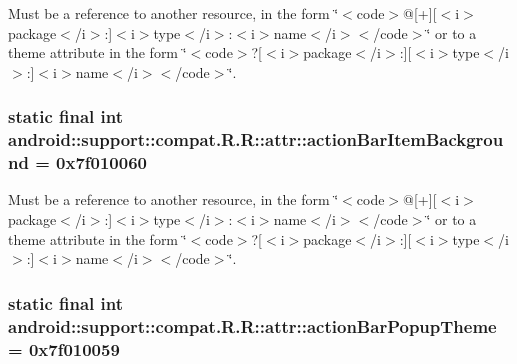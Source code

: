 Must be a reference to another resource, in the form \char`\"{}$<$code$>$@\mbox{[}+\mbox{]}\mbox{[}$<$i$>$package$<$/i$>$:\mbox{]}$<$i$>$type$<$/i$>$:$<$i$>$name$<$/i$>$$<$/code$>$\char`\"{} or to a theme attribute in the form \char`\"{}$<$code$>$?\mbox{[}$<$i$>$package$<$/i$>$:\mbox{]}\mbox{[}$<$i$>$type$<$/i$>$:\mbox{]}$<$i$>$name$<$/i$>$$<$/code$>$\char`\"{}. \hypertarget{classandroid_1_1support_1_1compat_1_1_r_1_1attr_c2de6e88cf678af3f457b2fa0781e0b9}{
\subsubsection[{actionBarItemBackground}]{\setlength{\rightskip}{0pt plus 5cm}static final int android::support::compat.R.R::attr::actionBarItemBackground = 0x7f010060}}
\label{classandroid_1_1support_1_1compat_1_1_r_1_1attr_c2de6e88cf678af3f457b2fa0781e0b9}


Must be a reference to another resource, in the form \char`\"{}$<$code$>$@\mbox{[}+\mbox{]}\mbox{[}$<$i$>$package$<$/i$>$:\mbox{]}$<$i$>$type$<$/i$>$:$<$i$>$name$<$/i$>$$<$/code$>$\char`\"{} or to a theme attribute in the form \char`\"{}$<$code$>$?\mbox{[}$<$i$>$package$<$/i$>$:\mbox{]}\mbox{[}$<$i$>$type$<$/i$>$:\mbox{]}$<$i$>$name$<$/i$>$$<$/code$>$\char`\"{}. \hypertarget{classandroid_1_1support_1_1compat_1_1_r_1_1attr_48bed46d06f99ac670f95ded412e457e}{
\subsubsection[{actionBarPopupTheme}]{\setlength{\rightskip}{0pt plus 5cm}static final int android::support::compat.R.R::attr::actionBarPopupTheme = 0x7f010059}}
\label{classandroid_1_1support_1_1compat_1_1_r_1_1attr_48bed46d06f99ac670f95ded412e457e}


